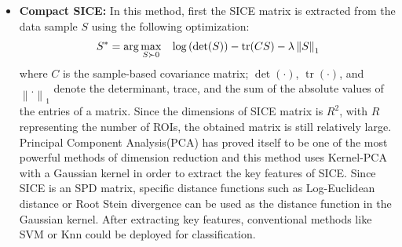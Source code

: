 \documentclass[journal]{IEEEtran}
\newcommand\norm[1]{\left\lVert#1\right\rVert}
\begin{document}
\begin{itemize}
	\item \textbf{Compact SICE:}
	In this method, first the SICE matrix is extracted from the data sample $S$ using the following optimization: 
	\begin{align}
	S^* = \operatorname{arg} \max\limits_{S\succ 0} \hspace{3mm} \log \left( \det(S) \right) - \operatorname{tr}(CS) - \lambda \norm{S}_1
	\end{align}
	where $C$ is the sample-based covariance matrix; $\det(·)$, $\operatorname{tr}(·)$,
	and $\norm{.}_1$ denote the determinant, trace, and the sum of the absolute values of the entries of a matrix. Since the dimensions of SICE matrix is $R^2$, with $R$ representing the number of ROIs, the obtained matrix is still relatively large. Principal Component Analysis(PCA) has proved itself to be one of the most powerful methods of dimension reduction and this method uses Kernel-PCA with a Gaussian kernel in order to extract the key features of SICE.
	Since SICE is an SPD matrix, specific distance functions such as Log-Euclidean distance or Root Stein divergence can be used as the distance function in the Gaussian kernel.
	After extracting key features, conventional methods like SVM or Knn could be deployed for classification.
	

\end{itemize}
\end{document}
